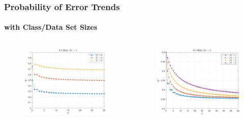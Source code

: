 \documentclass[aspectratio=169]{beamer}
\begin{document}
\begin{frame}
\frametitle{Probability of Error Trends}
\framesubtitle{with Class/Data Set Sizes}

\begin{columns}[c]

\begin{column}{.5\linewidth}

\begin{figure}
\centering
\includegraphics[width=1\linewidth]{Risk_01_uni_N_leg_My.pdf}
\label{fig:Risk_01_uni_N_leg_My}
\end{figure}

\end{column}

\begin{column}{.5\linewidth}

\begin{figure}
\centering
\includegraphics[width=1\linewidth]{Risk_01_uni_N_leg_Mx.pdf}
\label{fig:Risk_01_uni_N_leg_Mx}
\end{figure}


\end{column}
\end{columns}
\end{frame}
\end{document}
